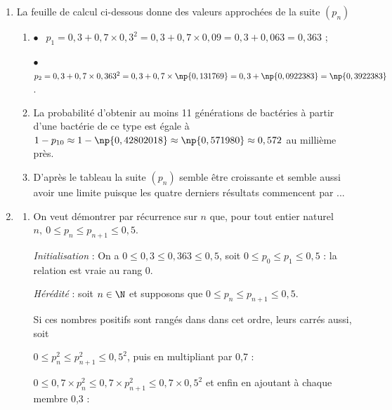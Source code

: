 \begin{enumerate}
\item La feuille de calcul ci-dessous donne des valeurs approchées de la suite $\left(p_n\right)$
	\begin{enumerate}
		\item %
$\bullet~~$ $p_1 = 0,3 + 0,7 \times 0,3^2 = 0,3 + 0,7 \times 0,09 = 0,3 + 0,063 = 0,363$ ;

$\bullet~~$ $p_2 = 0,3 + 0,7 \times 0,363^2 = 0,3 + 0,7 \times \np{0,131769} = 0,3 + \np{0,0922383} = \np{0,3922383}$.

		\item %
		La probabilité d'obtenir au moins 11 générations de bactéries à partir d'une bactérie de ce type est égale à $1 - p_{10} \approx 1 - \np{0,42802018} \approx \np{0,571980} \approx 0,572$ au millième près.
		
		\item %
D'après le tableau la suite $\left(p_n\right)$ semble être croissante et semble aussi avoir une limite puisque les quatre derniers résultats commencent par ...
	\end{enumerate}

\item 
	\begin{enumerate}
		\item On veut démontrer par récurrence sur $n$ que, pour tout entier naturel $n,\: 0 \leqslant p_n \leqslant p_{n+1} \leqslant0,5$.
		
\emph{Initialisation}  : On a $0 \leqslant 0,3 \leqslant 0,363 \leqslant 0,5$, soit $0 \leqslant p_0 \leqslant p_1 \leqslant 0,5$ : la relation est vraie au rang 0.

\emph{Hérédité} : soit $n \in \N$ et supposons que $0 \leqslant p_n \leqslant p_{n+1} \leqslant 0,5$.

Si ces nombres positifs sont rangés dans dans cet ordre, leurs carrés aussi, soit 

$0 \leqslant p_n^2 \leqslant p_{n+1}^2 \leqslant 0,5^2$, puis en multipliant par 0,7 :

$0 \leqslant 0,7 \times p_n^2 \leqslant 0,7 \times p_{n+1}^2 \leqslant 0,7 \times 0,5^2$ et enfin en ajoutant à chaque membre 0,3 :


\end{enumerate}
\end{enumerate}
